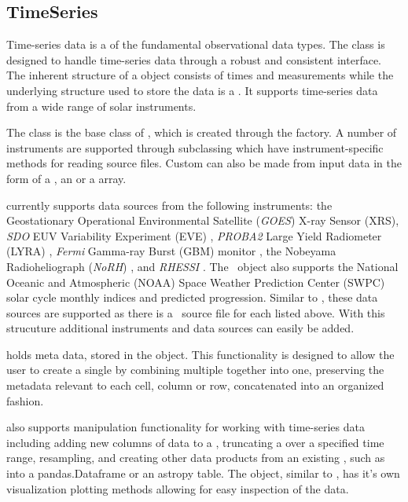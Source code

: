 \subsection{TimeSeries}
Time-series data is a of the fundamental observational data types. The \Timeseries class is designed to handle time-series data through a robust and consistent interface. The inherent structure of a \Timeseries object consists of times and measurements while the underlying structure used to store the data is a . It supports time-series data from a wide range of solar instruments. 

The \GenericTimeSeries class is the base class of \Timeseries, which is created through the \Timeseries factory. A number of instruments are supported through subclassing which have instrument-specific methods for reading source files. Custom \Timeseries can also be made from input data in the form of a , an  or a \numpy array. 

\Timeseries currently supports data sources from the following instruments: the Geostationary Operational Environmental Satellite (\textit{GOES}) X-ray Sensor (XRS), \textit{SDO} EUV Variability Experiment (EVE) \citep{woods2010extreme}, \textit{PROBA2} Large Yield Radiometer (LYRA) \citep{dominique2013lyra}, \textit{Fermi} Gamma-ray Burst (GBM) monitor \citep{meegan2009fermi}, the Nobeyama
Radioheliograph (\textit{NoRH}) \citep{nakajima1994nobeyama}, and \textit{RHESSI} \citep{lin2003reuven}. The \Timeseries\ object also supports the National Oceanic and Atmospheric (NOAA) Space Weather Prediction Center (SWPC) solar cycle monthly indices and predicted progression. Similar to \Map, these data sources are supported as there is a \Timeseries\ source file for each listed above. With this strucuture additional instruments and data sources can easily be added. 

\Timeseries holds meta data, stored in the \Timeseriesmetadata object. This functionality is designed to allow the user to create a single \Timeseries by combining multiple \Timeseries together into one, preserving the metadata relevant to each cell, column or row, concatenated into an organized fashion. 

\Timeseries also supports manipulation functionality for working with time-series data including adding new columns of data to a \Timeseries, truncating a \Timeseries over a specified time range, resampling, and creating other data products from an existing \Timeseries, such as into a pandas.Dataframe or an astropy table. The \Timeseries object, similar to \Map, has it's own visualization plotting methods allowing for easy inspection of the data.



